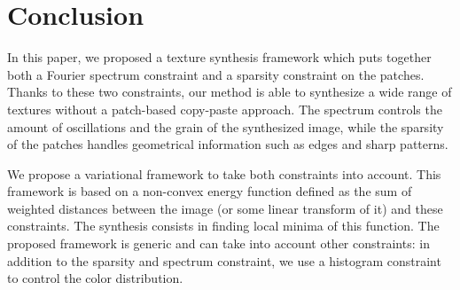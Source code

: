 \section{Conclusion}
\label{sec:conclusion}

In this paper, we proposed a texture synthesis framework which puts together both a Fourier spectrum constraint and a sparsity constraint on the patches.
Thanks to these two constraints, our method is able to synthesize a wide range of textures without a patch-based copy-paste approach.
The spectrum controls the amount of oscillations and the grain of the synthesized image,
while the sparsity of the patches handles geometrical information such as edges and sharp patterns.

We propose a variational framework to take both constraints into account.
This framework is based on a non-convex energy function defined as the sum of weighted distances between the image (or some linear transform of it) and these constraints.
The synthesis consists in finding local minima of this function.
The proposed framework is generic and can take into account other constraints: in addition to the sparsity and spectrum constraint, we use a histogram constraint to control the color distribution.